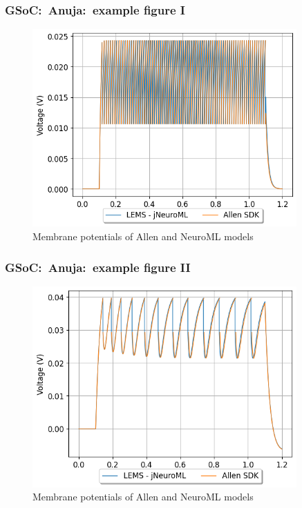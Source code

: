 \begin{frame}[c]
  \frametitle{GSoC:\ Anuja:\ example figure I}
  \begin{figure}[h]
    \centering
    \includegraphics[width=0.9\textwidth]{99_images/Comparison_129pA}
    \caption{Membrane potentials of Allen and NeuroML models}%
    \label{fig:99_images-Comparison_129pA}
  \end{figure}
\end{frame}
\begin{frame}[c]
  \frametitle{GSoC:\ Anuja:\ example figure II}
  \begin{figure}[h]
    \centering
    \includegraphics[width=0.9\textwidth]{99_images/Comparison_170pA}
    \caption{Membrane potentials of Allen and NeuroML models}%
    \label{fig:99_images-Comparison_170pA}
  \end{figure}
\end{frame}
